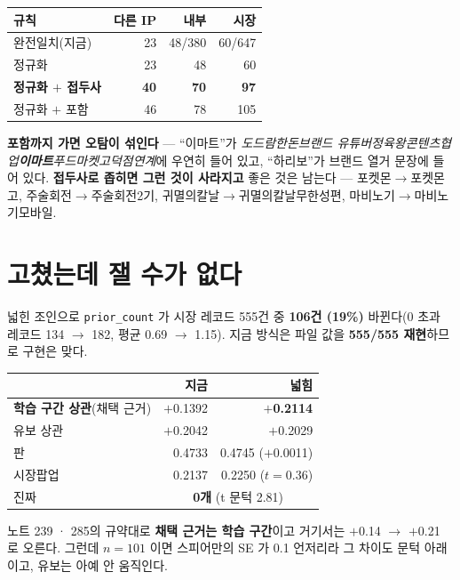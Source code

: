 \documentclass[10pt]{article}
\begin{document}
\begin{center}\small
\begin{tabular}{lrrr}
\hline
규칙 & 다른 IP & 내부 & 시장 \\
\hline
완전일치(지금) & 23 & 48/380 & 60/647 \\
정규화 & 23 & 48 & 60 \\
\textbf{정규화 $+$ 접두사} & \textbf{40} & \textbf{70} & \textbf{97} \\
정규화 $+$ 포함 & 46 & 78 & 105 \\
\hline
\end{tabular}
\end{center}

\textbf{포함까지 가면 오탐이 섞인다} --- ``이마트''가 \emph{도드람한돈브랜드
유튜버정육왕콘텐츠협업\textbf{이마트}푸드마켓고덕점연계}에 우연히 들어 있고,
``하리보''가 브랜드 열거 문장에 들어 있다. \textbf{접두사로 좁히면 그런 것이
사라지고} 좋은 것은 남는다 --- 포켓몬$\to$포켓몬고, 주술회전$\to$주술회전2기,
귀멸의칼날$\to$귀멸의칼날무한성편, 마비노기$\to$마비노기모바일.

\section{고쳤는데 잴 수가 없다}

넓힌 조인으로 \texttt{prior\_count} 가 시장 레코드 555건 중 \textbf{106건
(19\%)} 바뀐다(0 초과 레코드 134 $\to$ 182, 평균 0.69 $\to$ 1.15). 지금
방식은 파일 값을 \textbf{555/555 재현}하므로 구현은 맞다.

\begin{center}\small
\begin{tabular}{lrr}
\hline
& 지금 & 넓힘 \\
\hline
\textbf{학습 구간 상관}(채택 근거) & $+$0.1392 & \textbf{$+$0.2114} \\
유보 상관 & $+$0.2042 & $+$0.2029 \\
\hline
판 & 0.4733 & 0.4745 ($+$0.0011) \\
시장팝업 & 0.2137 & 0.2250 ($t{=}0.36$) \\
진짜 & \multicolumn{2}{c}{\textbf{0개} (t 문턱 2.81)} \\
\hline
\end{tabular}
\end{center}

노트 239 · 285의 규약대로 \textbf{채택 근거는 학습 구간}이고 거기서는
$+$0.14 $\to$ $+$0.21 로 오른다. 그런데 $n{=}101$ 이면 스피어만의 SE 가
0.1 언저리라 그 차이도 문턱 아래이고, 유보는 아예 안 움직인다.
\end{document}
